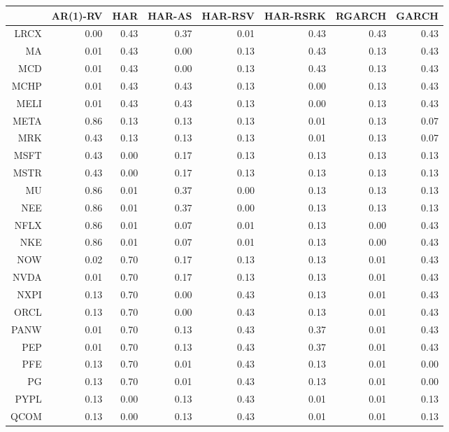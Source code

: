 \begin{table}[ht]
\centering
\begin{tabular}{rrrrrrrr}
  \hline
 & AR(1)-RV & HAR & HAR-AS & HAR-RSV & HAR-RSRK & RGARCH & GARCH \\ 
  \hline
LRCX & 0.00 & 0.43 & 0.37 & 0.01 & 0.43 & 0.43 & 0.43 \\ 
  MA & 0.01 & 0.43 & 0.00 & 0.13 & 0.43 & 0.13 & 0.43 \\ 
  MCD & 0.01 & 0.43 & 0.00 & 0.13 & 0.43 & 0.13 & 0.43 \\ 
  MCHP & 0.01 & 0.43 & 0.43 & 0.13 & 0.00 & 0.13 & 0.43 \\ 
  MELI & 0.01 & 0.43 & 0.43 & 0.13 & 0.00 & 0.13 & 0.43 \\ 
  META & 0.86 & 0.13 & 0.13 & 0.13 & 0.01 & 0.13 & 0.07 \\ 
  MRK & 0.43 & 0.13 & 0.13 & 0.13 & 0.01 & 0.13 & 0.07 \\ 
  MSFT & 0.43 & 0.00 & 0.17 & 0.13 & 0.13 & 0.13 & 0.13 \\ 
  MSTR & 0.43 & 0.00 & 0.17 & 0.13 & 0.13 & 0.13 & 0.13 \\ 
  MU & 0.86 & 0.01 & 0.37 & 0.00 & 0.13 & 0.13 & 0.13 \\ 
  NEE & 0.86 & 0.01 & 0.37 & 0.00 & 0.13 & 0.13 & 0.13 \\ 
  NFLX & 0.86 & 0.01 & 0.07 & 0.01 & 0.13 & 0.00 & 0.43 \\ 
  NKE & 0.86 & 0.01 & 0.07 & 0.01 & 0.13 & 0.00 & 0.43 \\ 
  NOW & 0.02 & 0.70 & 0.17 & 0.13 & 0.13 & 0.01 & 0.43 \\ 
  NVDA & 0.01 & 0.70 & 0.17 & 0.13 & 0.13 & 0.01 & 0.43 \\ 
  NXPI & 0.13 & 0.70 & 0.00 & 0.43 & 0.13 & 0.01 & 0.43 \\ 
  ORCL & 0.13 & 0.70 & 0.00 & 0.43 & 0.13 & 0.01 & 0.43 \\ 
  PANW & 0.01 & 0.70 & 0.13 & 0.43 & 0.37 & 0.01 & 0.43 \\ 
  PEP & 0.01 & 0.70 & 0.13 & 0.43 & 0.37 & 0.01 & 0.43 \\ 
  PFE & 0.13 & 0.70 & 0.01 & 0.43 & 0.13 & 0.01 & 0.00 \\ 
  PG & 0.13 & 0.70 & 0.01 & 0.43 & 0.13 & 0.01 & 0.00 \\ 
  PYPL & 0.13 & 0.00 & 0.13 & 0.43 & 0.01 & 0.01 & 0.13 \\ 
  QCOM & 0.13 & 0.00 & 0.13 & 0.43 & 0.01 & 0.01 & 0.13 \\ 

\end{tabular}
\end{table}
